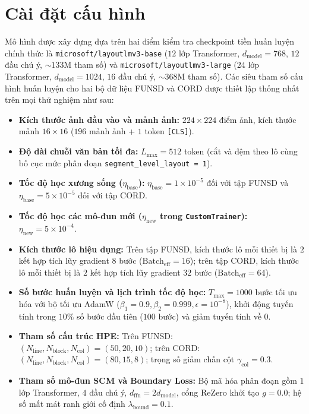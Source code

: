 \section{Cài đặt cấu hình}
Mô hình được xây dựng dựa trên hai điểm kiểm tra checkpoint tiền huấn luyện chính thức là \texttt{microsoft/layoutlmv3-base} ($12$ lớp Transformer, $d_{\text{model}} = 768$, $12$ đầu chú ý, $\sim 133\text{M}$ tham số) và \texttt{microsoft/layoutlmv3-large} ($24$ lớp Transformer, $d_{\text{model}} = 1024$, $16$ đầu chú ý, $\sim 368\text{M}$ tham số). Các siêu tham số cấu hình huấn luyện cho hai bộ dữ liệu FUNSD và CORD được thiết lập thống nhất trên mọi thử nghiệm như sau:
\begin{itemize}
    \item \textbf{Kích thước ảnh đầu vào và mảnh ảnh:} $224 \times 224$ điểm ảnh, kích thước mảnh $16 \times 16$ ($196$ mảnh ảnh + $1$ token \texttt{[CLS]}).
    \item \textbf{Độ dài chuỗi văn bản tối đa:} $L_{\max} = 512$ token (cắt và đệm theo lô cùng bố cục mức phân đoạn \texttt{segment\_level\_layout = 1}).
    \item \textbf{Tốc độ học xương sống ($\eta_{\text{base}}$):} $\eta_{\text{base}} = 1\times 10^{-5}$ đối với tập FUNSD và $\eta_{\text{base}} = 5\times 10^{-5}$ đối với tập CORD.
    \item \textbf{Tốc độ học các mô-đun mới ($\eta_{\text{new}}$ trong \texttt{CustomTrainer}):} $\eta_{\text{new}} = 5\times 10^{-4}$.
    \item \textbf{Kích thước lô hiệu dụng:} Trên tập FUNSD, kích thước lô mỗi thiết bị là $2$ kết hợp tích lũy gradient $8$ bước ($\text{Batch}_{\text{eff}} = 16$); trên tập CORD, kích thước lô mỗi thiết bị là $2$ kết hợp tích lũy gradient $32$ bước ($\text{Batch}_{\text{eff}} = 64$).
    \item \textbf{Số bước huấn luyện và lịch trình tốc độ học:} $T_{\max} = 1000$ bước tối ưu hóa với bộ tối ưu AdamW ($\beta_1 = 0.9, \beta_2 = 0.999, \epsilon = 10^{-8}$), khởi động tuyến tính trong $10\%$ số bước đầu tiên ($100$ bước) và giảm tuyến tính về $0$.
    \item \textbf{Tham số cấu trúc HPE:} Trên FUNSD: $(N_{\text{line}}, N_{\text{block}}, N_{\text{col}}) = (50, 20, 10)$; trên CORD: $(N_{\text{line}}, N_{\text{block}}, N_{\text{col}}) = (80, 15, 8)$; trọng số giảm chấn cột $\gamma_{\text{col}} = 0.3$.
    \item \textbf{Tham số mô-đun SCM và Boundary Loss:} Bộ mã hóa phân đoạn gồm $1$ lớp Transformer, $4$ đầu chú ý, $d_{\text{ffn}} = 2 d_{\text{model}}$, cổng ReZero khởi tạo $g = 0.0$; hệ số mất mát ranh giới cố định $\lambda_{\text{bound}} = 0.1$.
\end{itemize}

